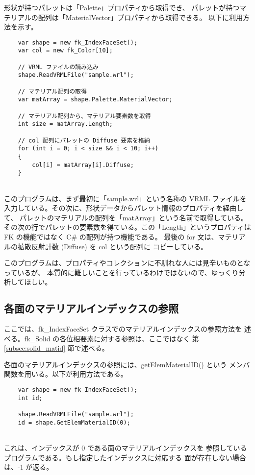 形状が持つパレットは「Palette」プロパティから取得でき、
パレットが持つマテリアルの配列は「MaterialVector」プロパティから取得できる。
以下に利用方法を示す。
\\
\begin{breakbox}
\begin{verbatim}
    var shape = new fk_IndexFaceSet();
    var col = new fk_Color[10];

    // VRML ファイルの読み込み
    shape.ReadVRMLFile("sample.wrl");

    // マテリアル配列の取得
    var matArray = shape.Palette.MaterialVector;

    // マテリアル配列から、マテリアル要素数を取得
    int size = matArray.Length;

    // col 配列にパレットの Diffuse 要素を格納
    for (int i = 0; i < size && i < 10; i++)
    {
        col[i] = matArray[i].Diffuse;
    }
\end{verbatim}
\end{breakbox}
~ \\
このプログラムは、まず最初に「sample.wrl」という名称の VRML ファイルを
入力している。その次に、形状データからパレット情報のプロパティを経由して、
パレットのマテリアルの配列を「matArray」という名前で取得している。
その次の行でパレットの要素数を得ている。この「Length」というプロパティは
FK の機能ではなく C\# の配列が持つ機能である。
最後の for 文は、マテリアルの拡散反射計数 (Diffuse) を col という配列に
コピーしている。

このプログラムは、プロパティやコレクションに不馴れな人には見辛いものとなっているが、
本質的に難しいことを行っているわけではないので、ゆっくり分析してほしい。

\subsection{各面のマテリアルインデックスの参照}
ここでは、fk\_IndexFaceSet クラスでのマテリアルインデックスの参照方法を
述べる。fk\_Solid の各位相要素に対する参照は、ここではなく
第 \ref{subsec:solid_matid} 節で述べる。

各面のマテリアルインデックスの参照には、getElemMaterialID() という
メンバ関数を用いる。以下が利用方法である。
\\
\begin{breakbox}
\begin{verbatim}
    var shape = new fk_IndexFaceSet();
    int id;

    shape.ReadVRMLFile("sample.wrl");
    id = shape.GetElemMaterialID(0);
\end{verbatim}
\end{breakbox}
~ \\
これは、インデックスが 0 である面のマテリアルインデックスを
参照しているプログラムである。もし指定したインデックスに対応する
面が存在しない場合は、-1 が返る。

